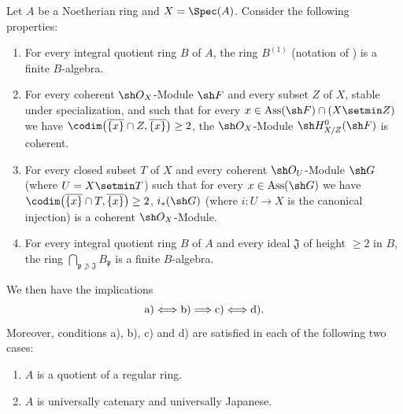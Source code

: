 \begin{corollary}[5.11.6]
\label{IV.5.11.6}
Let $A$ be a Noetherian ring and $X=\Spec(A)$.  Consider the
following properties:
\begin{enumerate}[{\rm a)}]
  \item For every integral quotient ring $B$ of $A$, the ring $B^{(1)}$
  \textup{(notation of )} is a finite $B$-algebra.
  \item For every coherent $\sh O_X$-Module $\sh F$ and every
  subset $Z$ of $X$, stable under specialization, and such that for
  every $x\in\operatorname{Ass}(\sh F)\cap(X\setmin Z)$ we have
  $\codim\bigl(\overline{\{x\}}\cap Z,\overline{\{x\}}\bigr)\geq2$,
  the $\sh O_X$-Module $\sh H^0_{X/Z}(\sh F)$ is coherent.
  \item For every closed subset $T$ of $X$ and every coherent
  $\sh O_U$-Module $\sh G$ \textup{(}where $U=X\setmin T$\textup{)} such
  that for every $x\in\operatorname{Ass}(\sh G)$ we have
  $\codim\bigl(\overline{\{x\}}\cap T,\overline{\{x\}}\bigr)\geq2$,
  $i_*(\sh G)$ \textup{(}where $i:U\to X$ is the canonical
  injection\textup{)} is a coherent $\sh O_X$-Module.
  \item For every integral quotient ring $B$ of $A$ and every ideal
  $\mathfrak J$ of height $\geq2$ in $B$, the ring
  $\bigcap_{\mathfrak p\not\supset\mathfrak J}B_{\mathfrak p}$
  is a finite $B$-algebra.
\end{enumerate}
We then have the implications
\[
  {\rm a)}\Longleftrightarrow{\rm b)}
  \Longrightarrow{\rm c)}
  \Longleftrightarrow{\rm d)}.
\]
Moreover, conditions \textup{a), b), c)} and \textup{d)} are satisfied
in each of the following two cases:
\begin{enumerate}[{\rm(i)}]
  \item $A$ is a quotient of a regular ring.
  \item $A$ is universally catenary and universally Japanese.
\end{enumerate}
\end{corollary}

